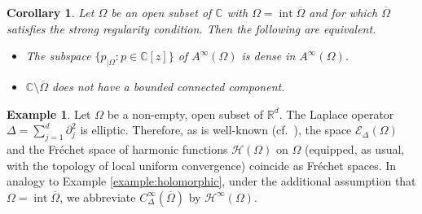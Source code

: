 \documentclass[10pt,leqno]{amsart}
\newtheorem{corollary}[prop]{Corollary}
\theoremstyle{definition}
\newtheorem{example}[prop]{Example}
\newcommand{\R}{\mathbb R}
\newcommand{\C}{\mathbb C}
\begin{document}
\begin{corollary}\label{cor:A infinity}
	Let $\Omega$ be an open subset of $\C$ with $\Omega=\operatorname{int}\overline{\Omega}$ and for which $\overline{\Omega}$ satisfies the strong regularity condition. Then the following are equivalent.
	\begin{itemize}
		\item[(i)] The subspace $\{p_{\mid\Omega}\colon p\in\C[z]\}$ of $A^\infty(\Omega)$ is dense in $A^\infty(\Omega)$.
		\item[(ii)] $\C\setminus\overline{\Omega}$ does not have a bounded connected component.
	\end{itemize} 
\end{corollary}

\begin{example}\label{example:harmonic}
	Let $\Omega$ be a non-empty, open subset of $\R^d$. The Laplace operator $\Delta=\sum_{j=1}^d\partial_j^2$ is elliptic. Therefore, as is well-known (cf.~\cite[Theorem 4.4.2]{Hor1}), the space $\mathscr{E}_\Delta(\Omega)$ and the Fr\'echet space of harmonic functions $\mathcal{H}(\Omega)$ on $\Omega$ (equipped, as usual, with the topology of local uniform convergence) coincide as Fr\'echet spaces. In analogy to Example \ref{example:holomorphic}, under the additional assumption that $\Omega=\operatorname{int}\overline{\Omega}$, we abbreviate $C_\Delta^\infty(\overline{\Omega})$ by $\mathcal{H}^\infty(\Omega)$.
	

\end{example}
\end{document}
